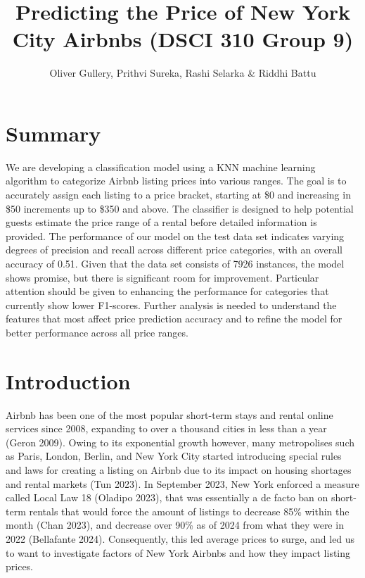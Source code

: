 \documentclass[
  letterpaper,
  DIV=11,
  numbers=noendperiod]{scrartcl}
\title{Predicting the Price of New York City Airbnbs (DSCI 310 Group 9)}
\author{Oliver Gullery, Prithvi Sureka, Rashi Selarka \& Riddhi Battu}
\date{}
\renewcommand*\contentsname{Table of contents}
\newcommand\contentsname{Table of contents}
\begin{document}
\maketitle

\renewcommand*\contentsname{Table of contents}
{
\hypersetup{linkcolor=}
\setcounter{tocdepth}{2}
\tableofcontents
}
\section{Summary}\label{summary}

We are developing a classification model using a KNN machine learning
algorithm to categorize Airbnb listing prices into various ranges. The
goal is to accurately assign each listing to a price bracket, starting
at \$0 and increasing in \$50 increments up to \$350 and above. The
classifier is designed to help potential guests estimate the price range
of a rental before detailed information is provided. The performance of
our model on the test data set indicates varying degrees of precision
and recall across different price categories, with an overall accuracy
of 0.51. Given that the data set consists of 7926 instances, the model
shows promise, but there is significant room for improvement. Particular
attention should be given to enhancing the performance for categories
that currently show lower F1-scores. Further analysis is needed to
understand the features that most affect price prediction accuracy and
to refine the model for better performance across all price ranges.

\section{Introduction}\label{introduction}

Airbnb has been one of the most popular short-term stays and rental
online services since 2008, expanding to over a thousand cities in less
than a year (Geron 2009). Owing to its exponential growth however, many
metropolises such as Paris, London, Berlin, and New York City started
introducing special rules and laws for creating a listing on Airbnb due
to its impact on housing shortages and rental markets (Tun 2023). In
September 2023, New York enforced a measure called Local Law 18 (Oladipo
2023), that was essentially a de facto ban on short-term rentals that
would force the amount of listings to decrease 85\% within the month
(Chan 2023), and decrease over 90\% as of 2024 from what they were in
2022 (Bellafante 2024). Consequently, this led average prices to surge,
and led us to want to investigate factors of New York Airbnbs and how
they impact listing prices.
\end{document}
